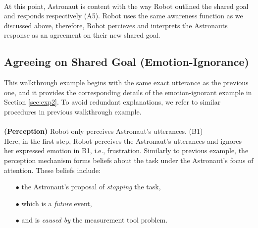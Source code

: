 \noindent{}\\

At this point, Astronaut is content with the way Robot outlined the shared goal
and responds respectively (A5). Robot uses the same awareness function as we
discussed above, therefore, Robot percieves and interprets the Astronauts
response as an agreement on their new shared goal.\\

\noindent{}

\subsection{Agreeing on Shared Goal (Emotion-Ignorance)}
\label{sec:wt-exp2}

This walkthrough example begins with the same exact utterance as the previous
one, and it provides the corresponding details of the emotion-ignorant example
in Section \ref{sec:exp2}. To avoid redundant explanations, we refer to similar
procedures in previous walkthrough example.\\

\noindent{}\\

\noindent\textbf{(Perception)} Robot only perceives Astronaut's utterances.
(B1)\\

Here, in the first step, Robot perceives the Astronaut's utterances and ignores
her expressed emotion in B1, i.e., frustration. Similarly to previous
example, the perception mechanism forms beliefs about the task under the
Astronaut's focus of attention. These beliefs include:

\begin{itemize}
  \item[$\bullet$] the Astronaut's proposal of \textit{stopping} the task,
  \item[$\bullet$] which is a \textit{future} event,
  \item[$\bullet$] and is \textit{caused by} the measurement tool problem.
\end{itemize}

